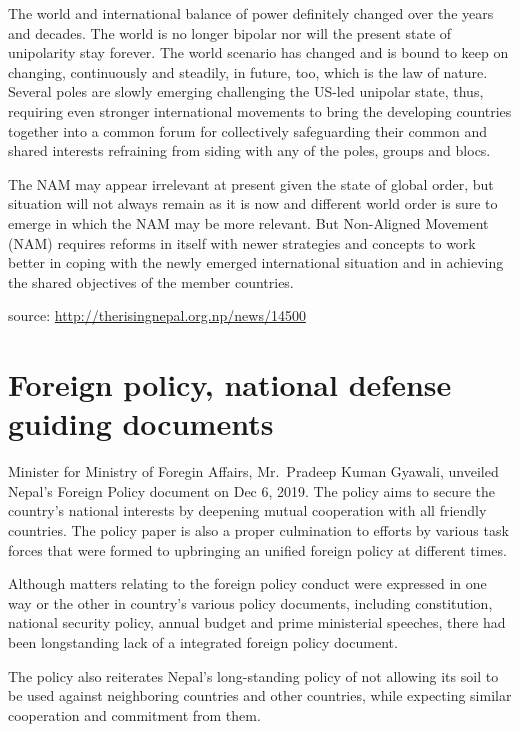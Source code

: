 \documentclass[
  openany]{book}
\begin{document}
The world and international balance of power definitely changed over the years and decades. The world is no longer bipolar nor will the present state of unipolarity stay forever. The world scenario has changed and is bound to keep on changing, continuously and steadily, in future, too, which is the law of nature. Several poles are slowly emerging challenging the US-led unipolar state, thus, requiring even stronger international movements to bring the developing countries together into a common forum for collectively safeguarding their common and shared interests refraining from siding with any of the poles, groups and blocs.

The NAM may appear irrelevant at present given the state of global order, but situation will not always remain as it is now and different world order is sure to emerge in which the NAM may be more relevant. But Non-Aligned Movement (NAM) requires reforms in itself with newer strategies and concepts to work better in coping with the newly emerged international situation and in achieving the shared objectives of the member countries.

source: \url{http://therisingnepal.org.np/news/14500}

\hypertarget{foreign-policy-national-defense-guiding-documents}{%
\chapter{Foreign policy, national defense guiding documents}\label{foreign-policy-national-defense-guiding-documents}}

Minister for Ministry of Foregin Affairs, Mr.~Pradeep Kuman Gyawali, unveiled Nepal's Foreign Policy document on Dec 6, 2019. The policy aims to secure the country's national interests by deepening mutual cooperation with all friendly countries. The policy paper is also a proper culmination to efforts by various task forces that were formed to upbringing an unified foreign policy at different times.

Although matters relating to the foreign policy conduct were expressed in one way or the other in country's various policy documents, including constitution, national security policy, annual budget and prime ministerial speeches, there had been longstanding lack of a integrated foreign policy document.

The policy also reiterates Nepal's long-standing policy of not allowing its soil to be used against neighboring countries and other countries, while expecting similar cooperation and commitment from them.
\end{document}
